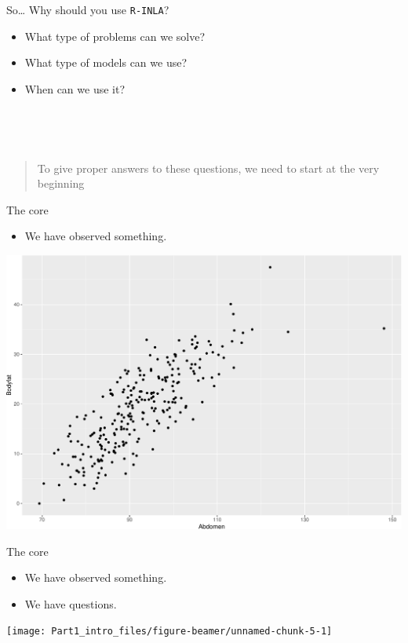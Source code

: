 \documentclass[
  ignorenonframetext,
]{beamer}
\providecommand{\tightlist}{%
  \setlength{\itemsep}{0pt}\setlength{\parskip}{0pt}}
\begin{document}
\begin{frame}{So\ldots{} Why should you use \texttt{R-INLA}?}
\protect\hypertarget{so-why-should-you-use-r-inla}{}
\begin{itemize}
\tightlist
\item
  What type of problems can we solve?
\item
  What type of models can we use?
\item
  When can we use it?\\
  \strut \\
  \strut \\
\end{itemize}

\begin{quote}
To give proper answers to these questions, we need to start at the very
beginning
\end{quote}
\end{frame}

\begin{frame}{The core}
\protect\hypertarget{the-core}{}
\begin{itemize}
\tightlist
\item
  We have observed something.
\end{itemize}

\begin{center}\includegraphics[width=0.6\linewidth]{Part1_intro_files/figure-beamer/unnamed-chunk-4-1} \end{center}
\end{frame}

\begin{frame}{The core}
\protect\hypertarget{the-core-1}{}
\begin{itemize}
\tightlist
\item
  We have observed something.
\item
  We have questions.
\end{itemize}

\begin{center}\texttt{[image: Part1\_intro\_files/figure-beamer/unnamed-chunk-5-1]} \end{center}
\end{frame}
\end{document}

